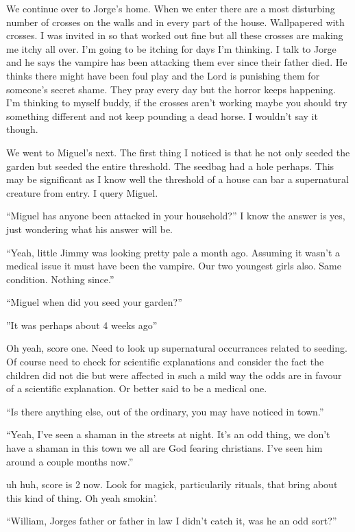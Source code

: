 We continue over to Jorge's home. When we enter there are a most disturbing number of crosses on the walls and in every part of the house. Wallpapered with crosses. I was invited in so that worked out fine but all these crosses are making me itchy all over. I'm going to be itching for days I'm thinking. I talk to Jorge and he says the vampire has been attacking them ever since their father died. He thinks there might have been foul play and the Lord is punishing them for someone's secret shame. They pray every day but the horror keeps happening. I'm thinking to myself buddy, if the crosses aren't working maybe you should try something different and not keep pounding a dead horse. I wouldn't say it though.

We went to Miguel's next. The first thing I noticed is that he not only seeded the garden but seeded the entire threshold. The seedbag had a hole perhaps. This may be significant as I know well the threshold of a house can bar a supernatural creature from entry. I query Miguel.

``Miguel has anyone been attacked in your household?'' I know the answer is yes, just wondering what his answer will be.

``Yeah, little Jimmy was looking pretty pale a month ago. Assuming it wasn't a medical issue it must have been the vampire. Our two youngest girls also. Same condition. Nothing since.''

``Miguel when did you seed your garden?''

''It was perhaps about 4 weeks ago''

Oh yeah, score one. Need to look up supernatural occurrances related to seeding. Of course need to check for scientific explanations and consider the fact the children did not die but were affected in such a mild way the odds are in favour of a scientific explanation. Or better said to be a medical one.

``Is there anything else, out of the ordinary, you may have noticed in town.''

``Yeah, I've seen a shaman in the streets at night. It's an odd thing, we don't have a shaman in this town we all are God fearing christians. I've seen him around a couple months now.''

uh huh, score is 2 now. Look for magick, particularily rituals, that bring about this kind of thing. Oh yeah smokin'.

``William, Jorges father or father in law I didn't catch it, was he an odd sort?''

